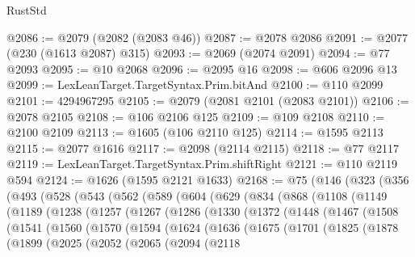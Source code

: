 \begin{lexlean}{RustStd}
\begin{coremodule}
@2086 := @2079 (@2082 (@2083 @46))
@2087 := @2078 @2086
@2091 := @2077 (@230 (@1613 @2087) @315)
@2093 := @2069 (@2074 @2091)
@2094 := @77 @2093
@2095 := @10 @2068
@2096 := @2095 @16
@2098 := @606 @2096 @13
@2099 := LexLeanTarget.TargetSyntax.Prim.bitAnd
@2100 := @110 @2099
@2101 := 4294967295
@2105 := @2079 (@2081 @2101 (@2083 @2101))
@2106 := @2078 @2105
@2108 := @106 @2106 @125
@2109 := @109 @2108
@2110 := @2100 @2109
@2113 := @1605 (@106 @2110 @125)
@2114 := @1595 @2113
@2115 := @2077 @1616
@2117 := @2098 (@2114 @2115)
@2118 := @77 @2117
@2119 := LexLeanTarget.TargetSyntax.Prim.shiftRight
@2121 := @110 @2119 @594
@2124 := @1626 (@1595 @2121 @1633)
@2168 := @75
    (@146
      (@323
        (@356
          (@493
            (@528
              (@543
                (@562
                  (@589
                    (@604
                      (@629
                        (@834
                          (@868
                            (@1108
                              (@1149
                                (@1189
                                  (@1238
                                    (@1257
                                      (@1267
                                        (@1286
                                          (@1330
                                            (@1372
                                              (@1448
                                                (@1467
                                                  (@1508
                                                    (@1541
                                                      (@1560
                                                        (@1570
                                                          (@1594
                                                            (@1624
                                                              (@1636
                                                                (@1675
                                                                  (@1701
                                                                    (@1825
                                                                      (@1878
                                                                        (@1899
                                                                          (@2025
                                                                            (@2052
                                                                              (@2065
                                                                                (@2094
                                                                                  (@2118

\end{coremodule}
\end{lexlean}

